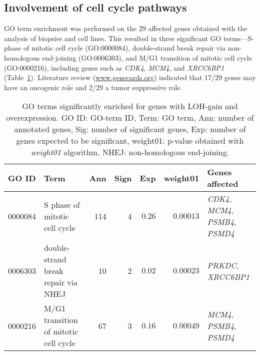 \subsection{Involvement of cell cycle pathways}
GO term enrichment was performed on the 29 affected genes obtained with the analysis of biopsies and cell lines. This resulted in three significant GO terms---S-phase of mitotic cell cycle (GO:0000084), double\hyp{}strand break repair via non\hyp{}homologous end\hyp{}joining (GO:0006303), and M/G1 transition of mitotic cell cycle (GO:0000216), including genes such as {\it CDK4}, {\it MCM4}, and {\it XRCC6BP1} (Table~\ref{tab8.1}). Literature review (\url{www.genecards.org}) indicated that 17/29 genes may have an oncogenic role and 2/29 a tumor suppressive role.
%
	\begin{table}[htbp]
		\centering
		\small
		\begin{tabular}[c]{|l p{1.85in} rrrr p{1.1in}|} %
			\hline
			GO ID & Term & Ann & Sign & Exp & weight01 & Genes affected\tabularnewline
			\hline
			0000084 & S phase of mitotic cell cycle & 114 & 4 & $0.26$ & $0.00013$ & {\it CDK4}, {\it MCM4}, {\it PSMB4}, {\it PSMD4}\\
			0006303 & double\hyp{}strand break repair via NHEJ & 10 & 2 & $0.02$ & $0.00023$ & {\it PRKDC}, {\it XRCC6BP1}\\
			0000216 & M/G1 transition of mitotic cell cycle & 67 & 3 & $0.16$ & $0.00049$ & {\it MCM4}, {\it PSMB4}, {\it PSMD4}\\
			\hline
		\end{tabular}
		\caption{GO terms significantly enriched for genes with LOH-gain and overexpression. GO ID: GO-term ID, Term: GO term, Ann: number of annotated genes, Sig: number of significant genes, Exp: number of genes expected to be significant, weight01: p-value obtained with {\it weight01} algorithm, NHEJ: non\hyp{}homologous end\hyp{}joining.}
		\label{tab8.1}
	\end{table}
%


